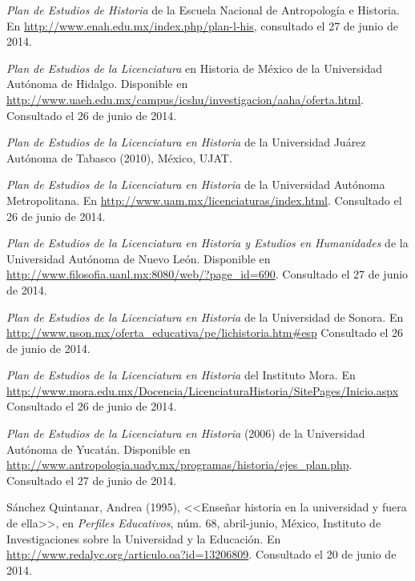 \textit{Plan de Estudios de Historia} de la Escuela Nacional de Antropología
e Historia. En \url{http://www.enah.edu.mx/index.php/plan-l-his}, consultado el
27 de junio de 2014.

\textit{Plan de Estudios de la Licenciatura} en Historia de México de la
Universidad Autónoma de Hidalgo. Disponible en
\url{http://www.uaeh.edu.mx/campus/icshu/investigacion/aaha/oferta.html}.
Consultado el 26 de junio de 2014.

\textit{Plan de Estudios de la Licenciatura en Historia} de la Universidad
Juárez Autónoma de Tabasco (2010), México, UJAT\@.

\textit{Plan de Estudios de la Licenciatura en Historia} de la Universidad
Autónoma Metropolitana. En \url{http://www.uam.mx/licenciaturas/index.html}.
Consultado el 26 de junio de 2014.

\textit{Plan de Estudios de la Licenciatura en Historia y Estudios en
Humanidades} de la Universidad Autónoma de Nuevo León. Disponible en
\url{http://www.filosofia.uanl.mx:8080/web/?page_id=690}. Consultado el 27
de junio de 2014.


\begin{sloppypar}
\textit{Plan de Estudios de la Licenciatura en Historia} de la Universidad
de Sonora. En \url{http://www.uson.mx/oferta_educativa/pe/lichistoria.htm#esp}
Consultado el 26 de junio de 2014.
\end{sloppypar}

\begin{sloppypar}
\textit{Plan de Estudios de la Licenciatura en Historia} del Instituto Mora. En
\url{http://www.mora.edu.mx/Docencia/LicenciaturaHistoria/SitePages/Inicio.aspx}
Consultado el 26 de junio de 2014.
\end{sloppypar}

\textit{Plan de Estudios de la Licenciatura en Historia} (2006) de la
Universidad Autónoma de Yucatán. Disponible en
\url{http://www.antropologia.uady.mx/programas/historia/ejes_plan.php}.
Consultado el 27 de junio de 2014.

\enlargethispage{2\baselineskip}
\begin{sloppypar}
Sánchez Quintanar, Andrea (1995), <<Enseñar historia en la universidad y
fuera de ella>>, en \textit{Perfiles Educativos}, núm. 68, abril-junio,
México, Instituto de Investigaciones sobre la Universidad y la Educación.
En \url{http://www.redalyc.org/articulo.oa?id=13206809}. Consultado el 20 de junio
de 2014.
\end{sloppypar}

